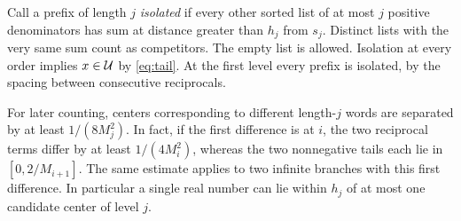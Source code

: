 \documentclass[11pt]{article}
\begin{document}
Call a prefix of length $j$ \emph{isolated} if every other sorted list of at most $j$ positive denominators has sum at distance greater than $h_j$ from $s_j$. Distinct lists with the very same sum count as competitors. The empty list is allowed. Isolation at every order implies $x\in\mathcal U$ by \eqref{eq:tail}. At the first level every prefix is isolated, by the spacing between consecutive reciprocals.

For later counting, centers corresponding to different length-$j$ words are separated by at least $1/(8M_j^2)$. In fact, if the first difference is at $i$, the two reciprocal terms differ by at least $1/(4M_i^2)$, whereas the two nonnegative tails each lie in $[0,2/M_{i+1}]$. The same estimate applies to two infinite branches with this first difference. In particular a single real number can lie within $h_j$ of at most one candidate center of level $j$.
\end{document}
